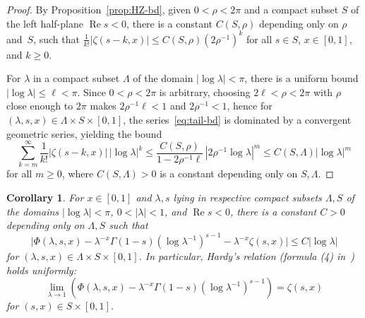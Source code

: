 \documentclass[11pt,a4paper,reqno]{amsart}
\renewcommand{\Re}{\operatorname{Re}}
\theoremstyle{plain}
\newtheorem{cor}[theorem]{Corollary}
\theoremstyle{remark}
\numberwithin{equation}{section}
\begin{document}
\begin{proof}
By Proposition~\ref{prop:HZ-bd}, given $0 < \rho < 2\pi$ and a compact subset $S$ of the left half-plane $\Re s < 0$, there is a constant $C(S,\rho)$ depending only on $\rho$ and~$S$, such that $\frac{1}{k!}|\zeta(s-k,x)| \leq C(S,\rho) (2\rho^{-1})^{k}$ for all $s \in S$, $x \in [0,1]$, and $k \geq 0$.

For $\lambda$ in a compact subset $\Lambda$ of the domain $|\log\lambda|<\pi$, there is a uniform bound $|\log \lambda| \leq \ell < \pi$. Since $0 < \rho < 2\pi$ is arbitrary, choosing $2 \ell < \rho < 2\pi$ with $\rho$ close enough to $2\pi$ makes $2 \rho^{-1} \ell < 1$ and $2\rho^{-1} < 1$, hence for $(\lambda,s,x) \in \Lambda \times S \times [0,1]$, the series~\eqref{eq:tail-bd} is dominated by a convergent geometric series, yielding the bound
\[
	 \sum_{k=m}^{\infty} \frac{1}{k!}|\zeta(s-k,x)| \, |\log\lambda|^{k}
	 \leq \frac{C(S,\rho)}{1 - 2\rho^{-1}\ell} \, {|2\rho^{-1}\log\lambda|}^{m}
	 \leq C(S,\Lambda) |\log\lambda|^{m}
\]
for all $m \geq 0$, where $C(S,\Lambda) > 0$ is a constant depending only on $S,\Lambda$.
\end{proof}

\begin{cor}
\label{cor:Hardy-rel}
For $x \in [0,1]$ and $\lambda,s$ lying in respective compact subsets $\Lambda,S$ of the domains $|\log \lambda| < \pi$, $0 < |\lambda| < 1$, and $\Re s < 0$, there is a constant $C > 0$ depending only on $\Lambda,S$ such that
%
\begin{equation}
\label{eq:Hardy-bd}
	\big|\Phi(\lambda,s,x) - \lambda^{-x}\Gamma(1-s){(\log \lambda^{-1})}^{s-1} - \lambda^{-x}\zeta(s,x)\big| 
	\leq C |\log \lambda|
\end{equation}
%
for $(\lambda,s,x) \in \Lambda \times S \times [0,1]$.
In particular, \emph{Hardy's relation} (formula (4) in~\cite{Johnson}) holds uniformly:
%
\begin{equation}
\label{eq:Hardy-rel}
	\lim_{\lambda \to 1} \left( \Phi(\lambda,s,x) - \lambda^{-x} \Gamma(1-s){(\log \lambda^{-1})}^{s-1}\right) 
	= \zeta(s,x)
\end{equation}
%
for $(s,x) \in S \times [0,1]$.
\end{cor}
\end{document}
